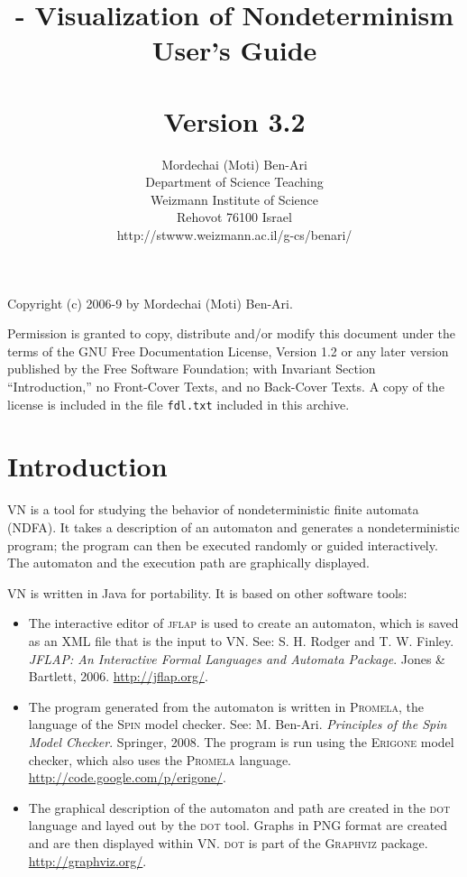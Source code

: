 \documentclass[11pt]{article}
\title{\vn{} - Visualization of Nondeterminism\\User's Guide\\\mbox{}\\\large{Version 3.2}}
\author{Mordechai (Moti) Ben-Ari\\
Department of Science Teaching\\
Weizmann Institute of Science\\
Rehovot 76100 Israel\\
\textsf{http://stwww.weizmann.ac.il/g-cs/benari/}}
\newcommand{\vn}{\textsc{VN}}
\newcommand{\jf}{\textsc{jflap}}
\newcommand{\dt}{\textsc{dot}}
\newcommand{\spn}{\textsc{Spin}}
\newcommand{\prm}{\textsc{Promela}}
\newcommand{\erg}{\textsc{Erigone}}
\newcommand{\p}[1]{\texttt{#1}}
\begin{document}
\maketitle
\thispagestyle{empty}

\vfil

\begin{center}
Copyright (c) 2006-9 by Mordechai (Moti) Ben-Ari.
\end{center}
Permission is granted to copy, distribute and/or modify this document
under the terms of the GNU Free Documentation License, Version 1.2
or any later version published by the Free Software Foundation;
with Invariant Section ``Introduction,'' no Front-Cover Texts, and no Back-Cover Texts.
A copy of the license is included in the file \p{fdl.txt}
included in this archive.

\newpage

\section{Introduction}

\vn{} is a tool for studying the behavior of nondeterministic finite automata 
(NDFA). It takes a description of an automaton and generates a nondeterministic 
program; the program can then be executed randomly or guided interactively. The 
automaton and the execution path are graphically displayed.

\vn{} is written in Java for portability. It is based on other software tools: 
\begin{itemize}
\item The interactive editor of \jf{} is used to 
create an automaton, which is saved as an XML file that is the input to \vn{}. See: 
S. H. Rodger and T. W. Finley. \textit{JFLAP: An Interactive Formal 
Languages and Automata Package}. Jones \& Bartlett, 2006. \url{http://jflap.org/}.
\item The program generated from the automaton is written in 
\prm{}, the language of the \spn{} model checker. See: M. Ben-Ari. 
\textit{Principles of the Spin Model Checker}. Springer, 2008.
The program is run using the \erg{} model checker, which also uses
the \prm{} language. \url{http://code.google.com/p/erigone/}.
\item The graphical description of the automaton and path are created in the \dt{} 
language and layed out by the \dt{} tool. Graphs in PNG format are created and
are then displayed within \vn{}. \dt{} is part of the \textsc{Graphviz} 
package. \url{http://graphviz.org/}.
\end{itemize}
\end{document}
